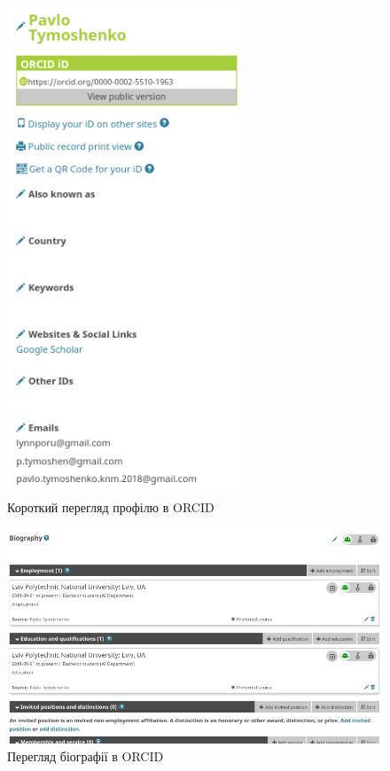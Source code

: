 \documentclass[oneside,14pt,a4paper]{extreport}
\begin{document}
\begin{figure}[H]
    \centering
    \includegraphics[width=7cm]{imgs/orcid_brief.png}
    \caption{Короткий перегляд профілю в ORCID}
    \label{pic:orcid-brief}
\end{figure}

\begin{figure}[H]
    \centering
    \includegraphics[width=15cm]{imgs/orcid_biography.png}
    \caption{Перегляд біографії в ORCID}
    \label{pic:orcid-biography}
\end{figure}
\end{document}
